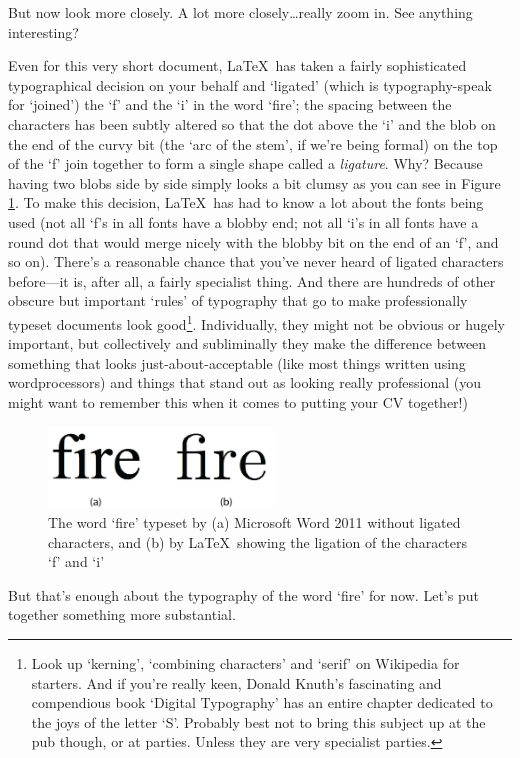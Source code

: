 \begin{refsection}
But now look more closely. A lot more closely\ldots really zoom in. See anything interesting?

Even for this very short document, \LaTeX\ has taken a fairly sophisticated typographical decision on your behalf and `ligated' (which is typo\-graphy-speak for `joined') the `f' and the `i' in the word `fire'; the spacing between the characters has been subtly altered so that the dot above the `i' and the blob on the end of the curvy bit (the `arc of the stem', if we're being formal) on the top of the `f' join together to form a single shape called a \emph{ligature}. Why? Because having two blobs side by side simply looks a bit clumsy as you can see in Figure \ref{figure:twofires}. To make this decision, \LaTeX\ has had to know a lot about the fonts being used (not all `f's in all fonts have a blobby end; not all `i's in all fonts have a round dot that would merge nicely with the blobby bit on the end of an `f', and so on). There's a reasonable chance that you've never heard of ligated characters before---it is, after all, a fairly specialist thing. And there are hundreds of other obscure but important `rules' of typography that go to make professionally typeset documents look good\footnote{Look up `kerning', `combining characters' and `serif' on Wikipedia for starters. And if you're really keen, Donald Knuth's fascinating and compendious book `Digital Typography' \citep{knuth1999} has an entire chapter dedicated to the joys of the letter `S'. Probably best not to bring this subject up at the pub though, or at parties. Unless they are very specialist parties.}. Individually, they might not be obvious or hugely important, but collectively and subliminally they make the difference between something that looks just-about-acceptable (like most things written using wordprocessors) and things that stand out as looking really professional (you might want to remember this when it comes to putting your CV together!)

\begin{figure}[htbp]
\centerline{\includegraphics[width=6cm]{images/fireandfire.png}}
\caption{The word `fire' typeset by (a) Microsoft Word 2011 without ligated characters, and (b) by \LaTeX\ showing the ligation of the characters `f' and `i'}\label{figure:twofires}
\end{figure}
%
But that's enough about the typography of the word `fire' for now. Let's put together something more substantial. 


\end{refsection}
